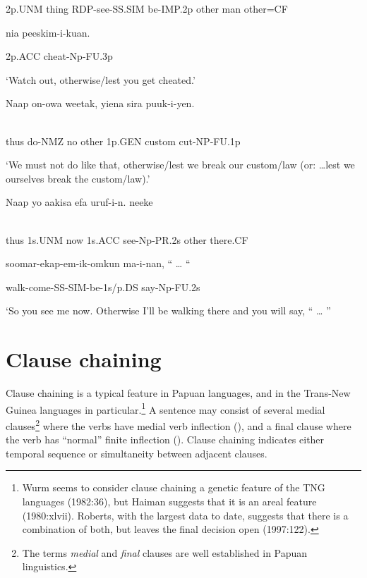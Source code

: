 2p.UNM  thing  RDP-see-SS.SIM  be-IMP.2p  other  man  other=CF

nia  peeskim-i-kuan.

2p.ACC  cheat-Np-FU.3p

`Watch out, otherwise/lest you get cheated.'

\ea%
\label{ex:x1427}
\gll Naap  on-owa  weetak,    yiena  sira  puuk-i-yen. \\
      \\
\glt
\z

thus  do-NMZ  no  other  1p.GEN  custom  cut-NP-FU.1p

`We must not do like that, otherwise/lest we break our custom/law (or: {\dots}lest we ourselves break the custom/law).'

\ea%
\label{ex:x1428}
\gll Naap  yo  aakisa  efa  uruf-i-n.    neeke \\
      \\
\glt
\z

thus  1s.UNM  now  1s.ACC  see-Np-PR.2s  other  there.CF

soomar-ekap-em-ik-omkun  ma-i-nan,  ``  {\dots } ``

walk-come-SS-SIM-be-1s/p.DS  say-Np-FU.2s

`So you see me now. Otherwise I'll be walking there and you will say, `` {\dots} ''

\section{Clause chaining}
\hypertarget{RefHeading23101935131865}{}
Clause chaining is a typical feature in Papuan languages, and in the Trans-New Guinea languages in particular.\footnote{Wurm seems to consider clause chaining a genetic feature of the TNG languages (1982:36), but Haiman suggests that it is an areal feature (1980:xlvii). Roberts, with the largest data to date, suggests that there is a combination of both, but leaves the final decision open (1997:122).}  A sentence may consist of several medial clauses\footnote{The terms \textit{medial} and \textit{final} clauses are well established in Papuan linguistics. }   where the verbs have medial verb inflection (), and a final clause where the verb has ``normal'' finite inflection (). Clause chaining indicates either temporal sequence or simultaneity between adjacent clauses.

